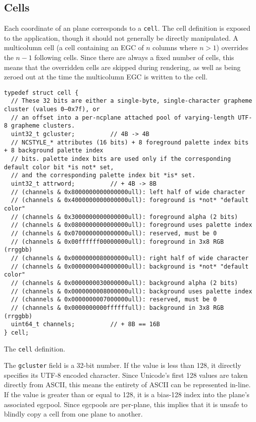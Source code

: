 \subsection{Cells}
\label{sec:cells}
Each coordinate of an plane corresponds to a \texttt{cell}. The cell definition
is exposed to the application, though it should not generally be directly
manipulated. A multicolumn cell (a cell containing an EGC of $n$ columns where
$n>1$) overrides the $n-1$ following cells. Since there are always a fixed
number of cells, this means that the overridden cells are skipped during
rendering, as well as being zeroed out at the time the multicolumn EGC is
written to the cell.
\begin{listing}[!htbp]
\begin{verbatim}
typedef struct cell {
  // These 32 bits are either a single-byte, single-character grapheme cluster (values 0–0x7f), or
  // an offset into a per-ncplane attached pool of varying-length UTF-8 grapheme clusters.
  uint32_t gcluster;          // 4B -> 4B
  // NCSTYLE_* attributes (16 bits) + 8 foreground palette index bits + 8 background palette index
  // bits. palette index bits are used only if the corresponding default color bit *is not* set,
  // and the corresponding palette index bit *is* set.
  uint32_t attrword;          // + 4B -> 8B
  // (channels & 0x8000000000000000ull): left half of wide character
  // (channels & 0x4000000000000000ull): foreground is *not* "default color"
  // (channels & 0x3000000000000000ull): foreground alpha (2 bits)
  // (channels & 0x0800000000000000ull): foreground uses palette index
  // (channels & 0x0700000000000000ull): reserved, must be 0
  // (channels & 0x00ffffff00000000ull): foreground in 3x8 RGB (rrggbb)
  // (channels & 0x0000000080000000ull): right half of wide character
  // (channels & 0x0000000040000000ull): background is *not* "default color"
  // (channels & 0x0000000030000000ull): background alpha (2 bits)
  // (channels & 0x0000000008000000ull): background uses palette index
  // (channels & 0x0000000007000000ull): reserved, must be 0
  // (channels & 0x0000000000ffffffull): background in 3x8 RGB (rrggbb)
  uint64_t channels;          // + 8B == 16B
} cell;
\end{verbatim}
\caption{The \texttt{cell} definition.}
\end{listing}
The \texttt{gcluster} field is a 32-bit number. If the value is less than 128,
it directly specifies its UTF-8 encoded character. Since Unicode's first 128
values are taken directly from ASCII, this means the entirety of ASCII can be
represented in-line. If the value is greater than or equal to 128, it is a
bias-128 index into the plane's associated egcpool. Since egcpools are per-plane,
this implies that it is unsafe to blindly copy a cell from one plane to another.

